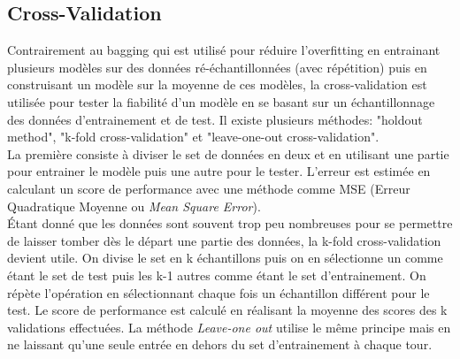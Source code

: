 \subsection{Cross-Validation}

Contrairement au bagging qui est utilisé pour réduire l'overfitting en entrainant plusieurs modèles sur des données ré-échantillonnées (avec répétition) puis en construisant un modèle sur la moyenne de ces modèles, la cross-validation est utilisée pour tester la fiabilité d'un modèle en se basant sur un échantillonnage des données d'entrainement et de test. Il existe plusieurs méthodes: "holdout method", "k-fold cross-validation" et "leave-one-out cross-validation".\\

\noindent La première consiste à diviser le set de données en deux et en utilisant une partie pour entrainer le modèle puis une autre pour le tester. L'erreur est estimée en calculant un score de performance avec une méthode comme MSE (Erreur Quadratique Moyenne ou \textit{Mean Square Error}). \\

\noindent Étant donné que les données sont souvent trop peu nombreuses pour se permettre de laisser tomber dès le départ une partie des données, la k-fold cross-validation devient utile. On divise le set en k échantillons puis on en sélectionne un comme étant le set de test puis les k-1 autres comme étant le set d'entrainement. On répète l'opération en sélectionnant chaque fois un échantillon différent pour le test. Le score de performance est calculé en réalisant la moyenne des scores des k validations effectuées. La méthode \textit{Leave-one out} utilise le même principe mais en ne laissant qu'une seule entrée en dehors du set d'entrainement à chaque tour\cite{hastie_09_elements-of.statistical-learning}. 


